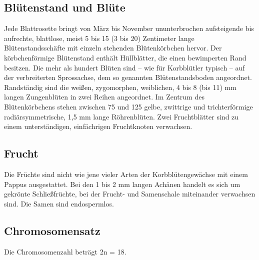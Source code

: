 \documentclass[11pt]{article}
\begin{document}
	\subsection{Blütenstand und Blüte}
	Jede Blattrosette bringt von März bis November ununterbrochen aufsteigende bis aufrechte, blattlose, meist 5 bis 15 (3 bis 20) Zentimeter\cite{3} lange Blütenstandsschäfte mit einzeln stehenden Blütenkörbchen hervor.\cite{2}
    Der körbchenförmige Blütenstand enthält Hüllblätter, die einen bewimperten Rand besitzen. Die mehr als hundert Blüten sind – wie für Korbblütler typisch – auf der verbreiterten Sprossachse, dem so genannten Blütenstandsboden angeordnet.\cite{3} Randständig sind die weißen, zygomorphen, weiblichen, 4 bis 8 (bis 11) mm\cite{3} langen Zungenblüten in zwei Reihen angeordnet. Im Zentrum des Blütenkörbchens stehen zwischen 75 und 125 gelbe, zwittrige und trichterförmige radiärsymmetrische, 1,5 mm lange\cite{3} Röhrenblüten. Zwei Fruchtblätter sind zu einem unterständigen, einfächrigen Fruchtknoten verwachsen.

	\subsection{Frucht}
	Die Früchte sind nicht wie jene vieler Arten der Korbblütengewächse mit einem Pappus ausgestattet. Bei den 1 bis 2 mm langen Achänen\cite{3} handelt es sich um gekrönte Schließfrüchte, bei der Frucht- und Samenschale miteinander verwachsen sind. Die Samen sind endospermlos.
	
	\subsection{Chromosomensatz}
	Die Chromosomenzahl beträgt 2n = 18.\cite{2}
	
\end{document}
